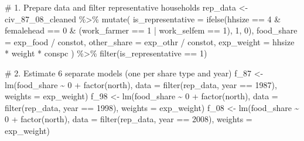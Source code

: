 \documentclass[
  letterpaper,
  DIV=11,
  numbers=noendperiod]{scrartcl}
\newenvironment{Shaded}{\begin{snugshade}}{\end{snugshade}}
\newcommand{\AttributeTok}[1]{\textcolor[rgb]{0.40,0.45,0.13}{#1}}
\newcommand{\CommentTok}[1]{\textcolor[rgb]{0.37,0.37,0.37}{#1}}
\newcommand{\DecValTok}[1]{\textcolor[rgb]{0.68,0.00,0.00}{#1}}
\newcommand{\FunctionTok}[1]{\textcolor[rgb]{0.28,0.35,0.67}{#1}}
\newcommand{\NormalTok}[1]{\textcolor[rgb]{0.00,0.23,0.31}{#1}}
\newcommand{\OtherTok}[1]{\textcolor[rgb]{0.00,0.23,0.31}{#1}}
\newcommand{\SpecialCharTok}[1]{\textcolor[rgb]{0.37,0.37,0.37}{#1}}
\begin{document}
\begin{Shaded}
\begin{Highlighting}[]
\CommentTok{\# 1. Prepare data and filter representative households}
\NormalTok{rep\_data }\OtherTok{\textless{}{-}}\NormalTok{ civ\_87\_08\_cleaned }\SpecialCharTok{\%\textgreater{}\%}
  \FunctionTok{mutate}\NormalTok{(}
    \AttributeTok{is\_representative =} \FunctionTok{ifelse}\NormalTok{(hhsize }\SpecialCharTok{==} \DecValTok{4} \SpecialCharTok{\&}\NormalTok{ femalehead }\SpecialCharTok{==} \DecValTok{0} \SpecialCharTok{\&}\NormalTok{ (work\_farmer }\SpecialCharTok{==} \DecValTok{1} \SpecialCharTok{|}\NormalTok{ work\_selfem }\SpecialCharTok{==} \DecValTok{1}\NormalTok{), }\DecValTok{1}\NormalTok{, }\DecValTok{0}\NormalTok{),}
    \AttributeTok{food\_share  =}\NormalTok{ exp\_food }\SpecialCharTok{/}\NormalTok{ constot,}
    \AttributeTok{other\_share =}\NormalTok{ exp\_othr }\SpecialCharTok{/}\NormalTok{ constot,}
    \AttributeTok{exp\_weight  =}\NormalTok{ hhsize }\SpecialCharTok{*}\NormalTok{ weight }\SpecialCharTok{*}\NormalTok{ conspc}
\NormalTok{  ) }\SpecialCharTok{\%\textgreater{}\%}
  \FunctionTok{filter}\NormalTok{(is\_representative }\SpecialCharTok{==} \DecValTok{1}\NormalTok{)}

\CommentTok{\# 2. Estimate 6 separate models (one per share type and year)}
\NormalTok{f\_87 }\OtherTok{\textless{}{-}} \FunctionTok{lm}\NormalTok{(food\_share  }\SpecialCharTok{\textasciitilde{}} \DecValTok{0} \SpecialCharTok{+} \FunctionTok{factor}\NormalTok{(north), }\AttributeTok{data =} \FunctionTok{filter}\NormalTok{(rep\_data, year }\SpecialCharTok{==} \DecValTok{1987}\NormalTok{), }\AttributeTok{weights =}\NormalTok{ exp\_weight)}
\NormalTok{f\_98 }\OtherTok{\textless{}{-}} \FunctionTok{lm}\NormalTok{(food\_share  }\SpecialCharTok{\textasciitilde{}} \DecValTok{0} \SpecialCharTok{+} \FunctionTok{factor}\NormalTok{(north), }\AttributeTok{data =} \FunctionTok{filter}\NormalTok{(rep\_data, year }\SpecialCharTok{==} \DecValTok{1998}\NormalTok{), }\AttributeTok{weights =}\NormalTok{ exp\_weight)}
\NormalTok{f\_08 }\OtherTok{\textless{}{-}} \FunctionTok{lm}\NormalTok{(food\_share  }\SpecialCharTok{\textasciitilde{}} \DecValTok{0} \SpecialCharTok{+} \FunctionTok{factor}\NormalTok{(north), }\AttributeTok{data =} \FunctionTok{filter}\NormalTok{(rep\_data, year }\SpecialCharTok{==} \DecValTok{2008}\NormalTok{), }\AttributeTok{weights =}\NormalTok{ exp\_weight)}


\end{Highlighting}
\end{Shaded}
\end{document}
